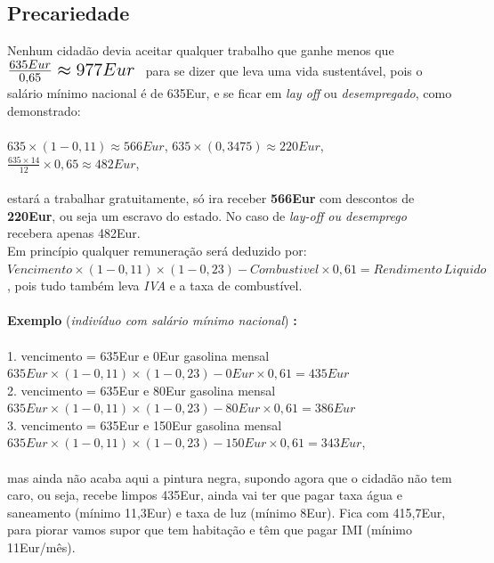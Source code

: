 \subsection{Precariedade}
\qquad Nenhum cidadão devia aceitar qualquer trabalho que ganhe menos que \; $ \mbox{\Large $ \frac{635Eur}{0,65}\approx 977Eur $ } $ para se dizer que leva uma vida sustentável, pois o salário mínimo nacional é de 635Eur, e se ficar em \textit{lay off} ou \textit{desempregado}, como demonstrado: \\
\\
\hspace*{.3cm} $635\times(1-0,11)\approx566Eur$,\hspace*{1cm} $635\times(0,3475)\approx220Eur$,\hspace*{1cm} $\frac{635\times14}{12}\times0,65 \approx 482Eur$, \\
\\
estará a trabalhar gratuitamente, só ira receber \textbf{566Eur} com descontos de \textbf{220Eur}, ou seja um escravo do estado. No caso de \textit{lay-off ou desemprego} recebera apenas 482Eur.\\
Em princípio qualquer remuneração será deduzido por: $Vencimento \times (1-0,11) \times (1-0,23) - Combustivel\times 0,61 = Rendimento \, Liquido$, pois tudo também leva \textit{IVA} e a taxa de combustível. \\
\\
\textbf{Exemplo} (\textit{indivíduo com salário mínimo nacional}) \; \textbf{:}\\
\\
1. vencimento = 635Eur e 0Eur gasolina mensal \\
\hspace*{1cm} $635Eur \times (1-0,11) \times (1-0,23) - 0Eur \times 0,61 = 435Eur$ \\
2. vencimento = 635Eur e 80Eur gasolina mensal \\
\hspace*{1cm} $635Eur \times (1-0,11) \times (1-0,23) - 80Eur \times 0,61 = 386Eur$ \\
3. vencimento = 635Eur e 150Eur gasolina mensal \\
\hspace*{1cm} $635Eur \times (1-0,11) \times (1-0,23) - 150Eur \times 0,61 = 343Eur$, \\
\\
mas ainda não acaba aqui a pintura negra, supondo agora que o cidadão não tem caro, ou seja, recebe limpos 435Eur, ainda vai ter que pagar taxa água e saneamento (mínimo 11,3Eur) e taxa de luz (mínimo 8Eur). Fica com 415,7Eur, para piorar vamos supor que tem habitação e têm que pagar IMI (mínimo 11Eur/mês).
